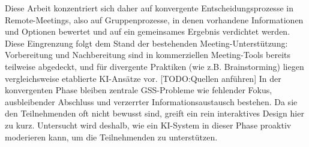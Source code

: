 Diese Arbeit konzentriert sich daher auf konvergente Entscheidungsprozesse in Remote-Meetings, also auf
Gruppenprozesse, in denen vorhandene Informationen und Optionen bewertet und auf ein gemeinsames Ergebnis
verdichtet werden.
Diese Eingrenzung folgt dem Stand der bestehenden Meeting-Unterstützung: Vorbereitung und Nachbereitung sind in
kommerziellen Meeting-Tools bereits teilweise abgedeckt, und für divergente Praktiken (wie z.B. Brainstorming) liegen
vergleichsweise etablierte KI-Ansätze vor. [TODO:Quellen anführen]
In der konvergenten Phase bleiben zentrale GSS-Probleme wie fehlender Fokus, ausbleibender Abschluss und
verzerrter Informationsaustausch bestehen. Da sie den Teilnehmenden oft nicht bewusst sind, greift ein rein
interaktives Design hier zu kurz. Untersucht wird deshalb, wie ein KI-System in dieser Phase proaktiv moderieren
kann, um die Teilnehmenden zu unterstützen.






